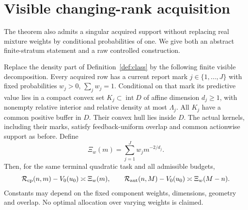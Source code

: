 \section{Visible changing-rank acquisition}\label{sec:singular}
The theorem also admits a singular acquired support without replacing real mixture weights by conditional probabilities of one. We give both an abstract finite-stratum statement and a raw controlled construction.

\begin{theorem}\label{thm:strata}
Replace the density part of Definition~\ref{def:class} by the following finite visible decomposition. Every acquired row has a current report mark $j\in\{1,\ldots,J\}$ with fixed probabilities $w_j>0$, $\sum_jw_j=1$. Conditional on that mark its predictive value lies in a compact convex set $K_j\subset\operatorname{int}D$ of affine dimension $d_j\ge1$, with nonempty relative interior and relative density at most $\Lambda_j$. All $K_j$ have a common positive buffer in $D$. Their convex hull lies inside $D$. The actual kernels, including their marks, satisfy feedback-uniform overlap and common actionwise support as before. Define
\begin{equation}\label{eq:xi}
 \Xi_w(m)=\sum_{j=1}^Jw_jm^{-2/d_j}.
\end{equation}
Then, for the same terminal quadratic task and all admissible budgets,
\[
 \mathcal R_{\rm cp}(n,m)-V_0(u_0)\asymp\Xi_w(m),\qquad
 \mathcal R_{\rm aut}(n,M)-V_0(u_0)\asymp\Xi_w(M-n).
\]
Constants may depend on the fixed component weights, dimensions, geometry and overlap. No optimal allocation over varying weights is claimed.
\end{theorem}
